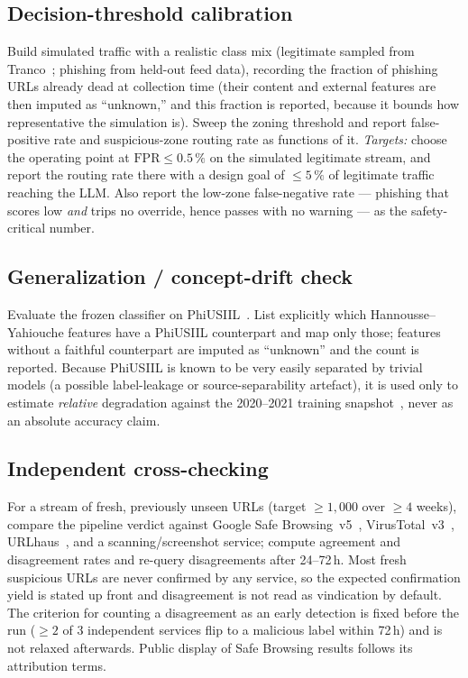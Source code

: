 \documentclass[conference]{IEEEtran}
\begin{document}
\subsection{Decision-threshold calibration}
\label{sec:eval-b}
Build simulated traffic with a realistic class mix (legitimate sampled from
Tranco~\cite{lepochat2019tranco}; phishing from held-out feed data), recording
the fraction of phishing URLs already dead at collection time (their content and
external features are then imputed as ``unknown,'' and this fraction is reported,
because it bounds how representative the simulation is). Sweep the zoning
threshold and report false-positive rate and suspicious-zone routing rate as
functions of it. \emph{Targets:} choose the operating point at
$\text{FPR} \le 0.5\,\%$ on the simulated legitimate stream, and report the
routing rate there with a design goal of $\le 5\,\%$ of legitimate traffic
reaching the LLM. Also report the low-zone false-negative rate --- phishing that
scores low \emph{and} trips no override, hence passes with no warning --- as the
safety-critical number.

\subsection{Generalization / concept-drift check}
\label{sec:eval-c}
Evaluate the frozen classifier on PhiUSIIL~\cite{prasad2024phiusiil}. List
explicitly which Hannousse--Yahiouche features have a PhiUSIIL counterpart and
map only those; features without a faithful counterpart are imputed as
``unknown'' and the count is reported. Because PhiUSIIL is known to be very
easily separated by trivial models (a possible label-leakage or
source-separability artefact), it is used only to estimate \emph{relative}
degradation against the 2020--2021 training snapshot~\cite{hannousse2021benchmark},
never as an absolute accuracy claim.

\subsection{Independent cross-checking}
\label{sec:eval-d}
For a stream of fresh, previously unseen URLs (target $\ge 1{,}000$ over
$\ge 4$ weeks), compare the pipeline verdict against Google Safe
Browsing~v5~\cite{gsb_v5}, VirusTotal~v3~\cite{virustotal_v3},
URLhaus~\cite{urlhaus}, and a scanning/screenshot service; compute agreement and
disagreement rates and re-query disagreements after 24--72\,h. Most fresh
suspicious URLs are never confirmed by any service, so the expected
confirmation yield is stated up front and disagreement is not read as
vindication by default. The criterion for counting a disagreement as an early
detection is fixed before the run ($\ge 2$ of 3 independent services flip to a
malicious label within 72\,h) and is not relaxed afterwards. Public display of
Safe Browsing results follows its attribution terms.
\end{document}
